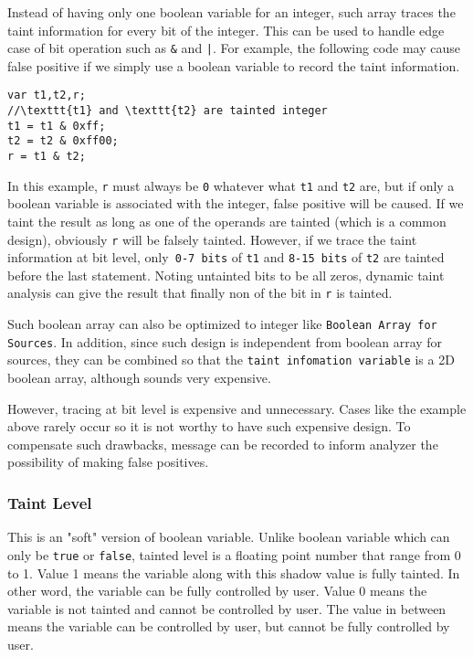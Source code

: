 Instead of having only one boolean variable for an integer, such array traces the taint information for every bit of the integer. This can be used to handle edge case of bit operation such as \texttt{&} and \texttt{|}. For example, the following code may cause false positive if we simply use a boolean variable to record the taint information.

\begin{scriptsize}
\estiloJs
\begin{lstlisting}[]
var t1,t2,r;
//\texttt{t1} and \texttt{t2} are tainted integer
t1 = t1 & 0xff;
t2 = t2 & 0xff00;
r = t1 & t2;
\end{lstlisting}
\end{scriptsize}


In this example, \texttt{r} must always be \texttt{0} whatever what \texttt{t1} and \texttt{t2} are, but if only a boolean variable is associated with the integer, false positive will be caused. If we taint the result as long as one of the operands are tainted (which is a common design), obviously \texttt{r} will be falsely tainted. However, if we trace the taint information at bit level, only\texttt{ 0-7 bits} of \texttt{t1} and \texttt{8-15 bits} of \texttt{t2} are tainted before the last statement. Noting untainted bits to be all zeros, dynamic taint analysis can give the result that finally non of the bit in \texttt{r} is tainted.

Such boolean array can also be optimized to integer like \texttt{Boolean Array for Sources}. In addition, since such design is independent from boolean array for sources, they can be combined so that the \texttt{taint infomation variable} is a 2D boolean array, although sounds very expensive.

However, tracing at bit level is expensive and unnecessary. Cases like the example above rarely occur so it is not worthy to have such expensive design. To compensate such drawbacks, message can be recorded to inform analyzer the possibility of making false positives.

\subsubsection{Taint Level}

This is an "soft" version of boolean variable. Unlike boolean variable which can only be \texttt{true} or \texttt{false}, tainted level is a floating point number that range from 0 to 1. Value 1 means the variable along with this shadow value is fully tainted. In other word, the variable can be fully controlled by user. Value 0 means the variable is not tainted and cannot be controlled by user. The value in between means the variable can be controlled by user, but cannot be fully controlled by user. 

